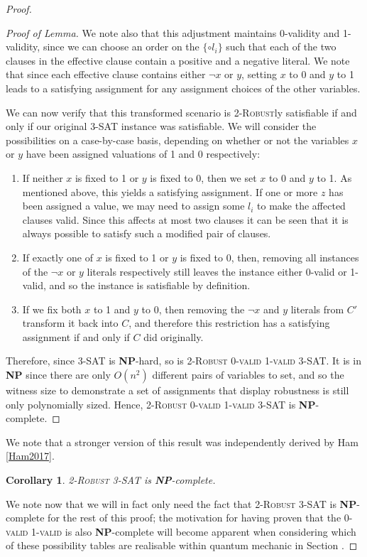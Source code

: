 \documentclass[reprint]{revtex4-1}
\newtheorem{cor}{Corollary}
\theoremstyle{definition}
\begin{document}
\begin{proof}
\begin{proof}[Proof of Lemma]
 We note also that this adjustment maintains 0-validity and 1-validity, since we can choose an order on the $\{\circ l_i\}$ such that each of the two clauses in the effective clause contain a positive and a negative literal. We note that since each effective clause contains either $\neg x$ or $y$, setting $x$ to 0 and $y$ to 1 leads to a satisfying assignment for any assignment choices of the other variables. 

We can now verify that this transformed scenario is \textsc{2-Robust}ly satisfiable if and only if our original \textsc{3-SAT} instance was satisfiable. We will consider the possibilities on a case-by-case basis, depending on whether or not the variables $x$ or $y$ have been assigned valuations of 1 and 0 respectively:
\begin{enumerate}
\item If neither $x$ is fixed to 1 or $y$ is fixed to 0, then we set $x$ to 0 and $y$ to 1. As mentioned above, this yields a satisfying assignment. If one or more $z$ has been assigned a value, we may need to assign some $l_i$ to make the affected clauses valid. Since this affects at most two clauses it can be seen that it is always possible to satisfy such a modified pair of clauses.

\item If exactly one of $x$ is fixed to 1 or $y$ is fixed to 0, then, removing all instances of the $\neg x$ or $y$ literals respectively still leaves the instance either 0-valid or 1-valid, and so the instance is satisfiable by definition.

\item If we fix both $x$ to 1 and $y$ to 0, then removing the $\neg x$ and $y$ literals from $C'$ transform it back into $C$, and therefore this restriction has a satisfying assignment if and only if $C$ did originally.
\end{enumerate}
Therefore, since \textsc{3-SAT} is \textbf{NP}-hard, so is \textsc{2-Robust 0-valid 1-valid 3-SAT}. It is in \textbf{NP} since there are only $O(n^2)$ different pairs of variables to set, and so the witness size to demonstrate a set of assignments that display robustness is still only polynomially sized.  Hence,  \textsc{2-Robust 0-valid 1-valid 3-SAT} is \textbf{NP}-complete.

\end{proof}
We note that a stronger version of this result was independently derived by Ham \ref{Ham2017}.
\begin{cor}
\textsc{2-Robust 3-SAT} is \textbf{NP}-complete.
\end{cor}
We note now that we will in fact only need the fact that \textsc{2-Robust 3-SAT} is \textbf{NP}-complete for the rest of this proof; the motivation for having proven that the \textsc{0-valid 1-valid} is also \textbf{NP}-complete will become apparent when considering which of these possibility tables are realisable within quantum mechanic in Section \label{QR}.


\end{proof}
\end{document}
